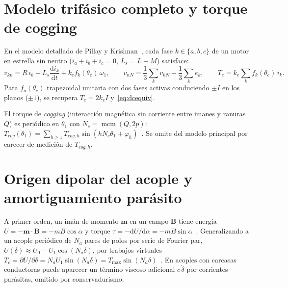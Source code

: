 \documentclass[11pt,a4paper,oneside]{report}
\theoremstyle{definition}
\theoremstyle{remark}
\newcommand{\dd}{\mathrm{d}}
\begin{document}
\section{Modelo trifásico completo y torque de cogging}\label{ap:motor_extendido}
En el modelo detallado de Pillay y Krishnan~\cite{pillay1989}, cada fase
$k\in\{a,b,c\}$ de un motor en estrella sin neutro ($i_a+i_b+i_c=0$, $L_s=L-M$)
satisface:
\begin{equation}
  v_{kn} = R\,i_k + L_s\frac{\dd i_k}{\dd t} + k_e f_k(\theta_e)\,\omega_1,
  \qquad
  v_{nN} = \frac{1}{3}\sum_k v_{kN} - \frac{1}{3}\sum_k e_k,
  \qquad
  T_e = k_e\sum_k f_k(\theta_e)\,i_k .
\end{equation}
Para $f_a(\theta_e)$ trapezoidal unitaria con dos fases activas conduciendo
$\pm I$ en los planos ($\pm 1$), se recupera $T_e = 2k_e I$ y~\eqref{eq:dcequiv}.

El torque de \emph{cogging} (interacción magnética sin corriente entre imanes y
ranuras $Q$) es periódico en $\theta_1$ con $N_c=\operatorname{mcm}(Q,2p)$:
$T_{cog}(\theta_1) = \sum_{h\ge 1} T_{cog,h}\sin(hN_c\theta_1 + \varphi_h)$~\cite{hanselman2006}.
Se omite del modelo principal por carecer de medición de $T_{cog,h}$.

\section{Origen dipolar del acople y amortiguamiento parásito}\label{ap:acople_dipolo}
A primer orden, un imán de momento $\mathbf m$ en un campo $\mathbf B$ tiene
energía $U=-\mathbf m\cdot\mathbf B = -mB\cos\alpha$ y torque
$\tau = -\dd U/\dd\alpha = -mB\sin\alpha$~\cite{griffiths2017}. Generalizando
a un acople periódico de $N_a$ pares de polos por serie de Fourier par,
$U(\delta)\approx U_0 - U_1\cos(N_a\delta)$, por trabajos virtuales
$T_c = \partial U/\partial\delta = N_a U_1\sin(N_a\delta) = T_{\max}\sin(N_a\delta)$~\cite{montague2012,ravaud2009}.
En acoples con carcasas conductoras puede aparecer un término viscoso adicional
$c\,\dot\delta$ por corrientes parásitas, omitido por conservadurismo.
\end{document}
